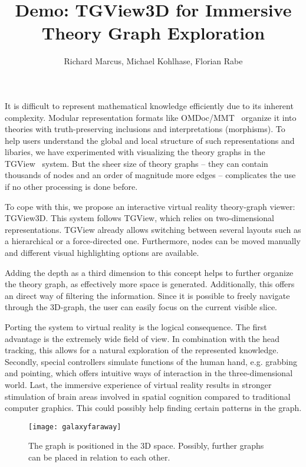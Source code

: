 \documentclass{llncs}
\title{Demo: TGView3D for Immersive Theory Graph Exploration}
\author{Richard Marcus, Michael Kohlhase, Florian Rabe}
\institute{Computer Science, FAU Erlangen-N\"urnberg}
\begin{document}
\maketitle

It is difficult to represent mathematical knowledge efficiently due to its inherent complexity.
Modular representation formats like OMDoc/MMT~\cite{Kohlhase:OMDoc1.2,RabKoh:WSMSML13} organize it into theories with truth-preserving inclusions and interpretations (morphisms).
To help users understand the global and local structure of such representations and libaries, we have experimented with visualizing the theory graphs in the TGView~\cite{RupKohMue:fitgv17} system. But the sheer size of theory graphs -- they can contain thousands of nodes and an order of magnitude more edges -- complicates the use if no other processing is done before.

To cope with this, we propose an interactive virtual reality theory-graph viewer: TGView3D. This system follows TGView, which relies on two-dimensional representations. TGView already allows switching between several layouts such as a hierarchical or a force-directed one. Furthermore, nodes can be moved manually and different visual highlighting options are available.

Adding the depth as a third dimension to this concept helps to further organize the theory graph, as effectively more space is generated. Additionally, this offers an direct way of filtering the information. Since it is possible to freely navigate through the 3D-graph, the user can easily focus on the current visible slice.

Porting the system to virtual reality is the logical consequence. The first advantage is the extremely wide field of view. In combination with the head tracking, this allows for a natural exploration of the represented knowledge. Secondly, special controllers simulate functions of the human hand, e.g. grabbing and pointing, which offers intuitive ways of interaction in the three-dimensional world. Last, the immersive experience of virtual reality results in stronger stimulation of brain areas involved in spatial cognition compared to traditional computer graphics. This could possibly help finding certain patterns in the graph.



\begin{figure}
    \centering
    \texttt{[image: galaxyfaraway]}
    \caption{The graph is positioned in the 3D space. Possibly, further graphs can be placed in relation to each other.}
    \label{fig:sample_figure1}
\end{figure}
\end{document}
